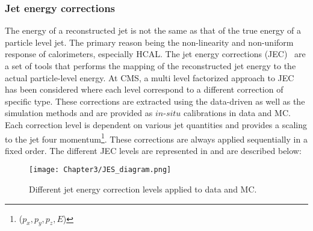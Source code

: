 \subsubsection{Jet energy corrections}\label{Se:JetEnCorr}
The energy of a reconstructed jet is not the same as that of the true energy of a particle level jet. The primary reason being the non-linearity and non-uniform
response of calorimeters, especially HCAL.    
The jet energy corrections (JEC)~\cite{CMS-PAS-JME-07-002} are a set of tools that performs the mapping of the reconstructed jet energy to the actual particle-level energy.
At CMS, a multi level factorized approach to JEC has been considered where each level correspond to a different correction of specific type. These corrections
are extracted using the data-driven as well as the simulation methods and are provided as $\textit{in-situ}$ calibrations in data and MC.  
Each correction level is dependent on various jet quantities and provides a scaling to the jet four momentum\footnote{($p_{x}, p_{y}, p_{z}, E$)}.
These corrections are always applied sequentially in a fixed order. The different JEC levels are represented in \fig{\ref{fig:JEC_levels}} and are described below:
\begin{figure}[h]
\begin{center}
\texttt{[image: Chapter3/JES\_diagram.png]}
\caption{Different jet energy correction levels applied to data and MC.}
\label{fig:JEC_levels}
\end{center}
\end{figure}
\vspace{-0.4in}
